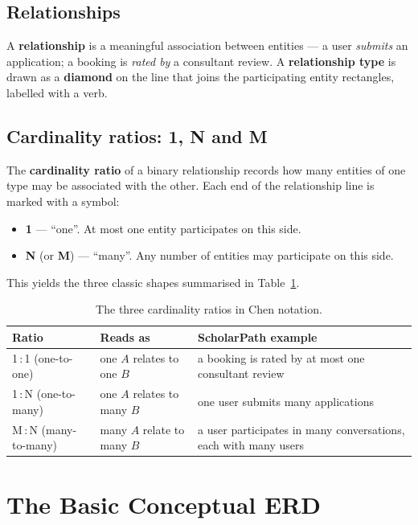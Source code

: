 \documentclass[11pt,a4paper]{article}
\begin{document}
\subsection{Relationships}

A \textbf{relationship} is a meaningful association between entities --- a user
\emph{submits} an application; a booking is \emph{rated by} a consultant review.
A \textbf{relationship type} is drawn as a \textbf{diamond} on the line that
joins the participating entity rectangles, labelled with a verb.

\subsection{Cardinality ratios: 1, N and M}

The \textbf{cardinality ratio} of a binary relationship records how many
entities of one type may be associated with the other. Each end of the
relationship line is marked with a symbol:

\begin{itemize}[leftmargin=1.4em]
  \item \textbf{1} --- ``one''. At most one entity participates on this side.
  \item \textbf{N} (or \textbf{M}) --- ``many''. Any number of entities may
        participate on this side.
\end{itemize}

This yields the three classic shapes summarised in Table~\ref{tab:cardinality}.

\begin{table}[H]\centering
\caption{The three cardinality ratios in Chen notation.}
\label{tab:cardinality}
\begin{tabular}{@{}lll@{}}
\toprule
\textbf{Ratio} & \textbf{Reads as} & \textbf{ScholarPath example} \\
\midrule
1\,:\,1 (one-to-one)   & one $A$ relates to one $B$        & a booking is rated by at most one consultant review \\
1\,:\,N (one-to-many)  & one $A$ relates to many $B$       & one user submits many applications \\
M\,:\,N (many-to-many) & many $A$ relate to many $B$       & a user participates in many conversations, each with many users \\
\bottomrule
\end{tabular}
\end{table}

\section{The Basic Conceptual ERD}
\end{document}
